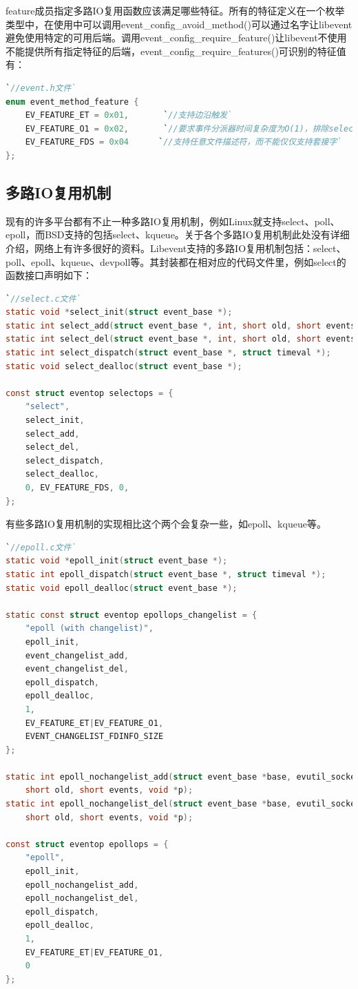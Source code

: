 \documentclass[11pt,a4paper]{article}
\begin{document}
feature成员指定多路IO复用函数应该满足哪些特征。所有的特征定义在一个枚举类型中，在使用中可以调用event\_config\_avoid\_method()可以通过名字让libevent避免使用特定的可用后端。调用event\_config\_require\_feature()让libevent不使用不能提供所有指定特征的后端，event\_config\_require\_features()可识别的特征值有：
\begin{lstlisting}[language=C]
`//event.h文件`
enum event_method_feature {
	EV_FEATURE_ET = 0x01,       `//支持边沿触发`
	EV_FEATURE_O1 = 0x02,       `//要求事件分派器时间复杂度为O(1)，排除select、poll等`
	EV_FEATURE_FDS = 0x04      `//支持任意文件描述符，而不能仅仅支持套接字`
};
\end{lstlisting}

\subsection{多路IO复用机制}
现有的许多平台都有不止一种多路IO复用机制，例如Linux就支持select、poll、epoll，而BSD支持的包括select、kqueue。关于各个多路IO复用机制此处没有详细介绍，网络上有许多很好的资料。Libevent支持的多路IO复用机制包括：select、poll、epoll、kqueue、devpoll等。其封装都在相对应的代码文件里，例如select的函数接口声明如下：
\begin{lstlisting}[language=C]
`//select.c文件`
static void *select_init(struct event_base *);
static int select_add(struct event_base *, int, short old, short events, void*);
static int select_del(struct event_base *, int, short old, short events, void*);
static int select_dispatch(struct event_base *, struct timeval *);
static void select_dealloc(struct event_base *);

const struct eventop selectops = {
	"select",
	select_init,
	select_add,
	select_del,
	select_dispatch,
	select_dealloc,
	0, EV_FEATURE_FDS, 0,
};  
\end{lstlisting}

有些多路IO复用机制的实现相比这个两个会复杂一些，如epoll、kqueue等。
\begin{lstlisting}[language=C]
`//epoll.c文件`
static void *epoll_init(struct event_base *);
static int epoll_dispatch(struct event_base *, struct timeval *);
static void epoll_dealloc(struct event_base *);

static const struct eventop epollops_changelist = {
	"epoll (with changelist)",
	epoll_init,
	event_changelist_add,
	event_changelist_del,
	epoll_dispatch,
	epoll_dealloc,
	1,
	EV_FEATURE_ET|EV_FEATURE_O1,
	EVENT_CHANGELIST_FDINFO_SIZE
};

static int epoll_nochangelist_add(struct event_base *base, evutil_socket_t fd,
    short old, short events, void *p);
static int epoll_nochangelist_del(struct event_base *base, evutil_socket_t fd,
    short old, short events, void *p);

const struct eventop epollops = {
	"epoll",
	epoll_init,
	epoll_nochangelist_add,
	epoll_nochangelist_del,
	epoll_dispatch,
	epoll_dealloc,
	1,
	EV_FEATURE_ET|EV_FEATURE_O1,
	0
};
\end{lstlisting}
\end{document}
